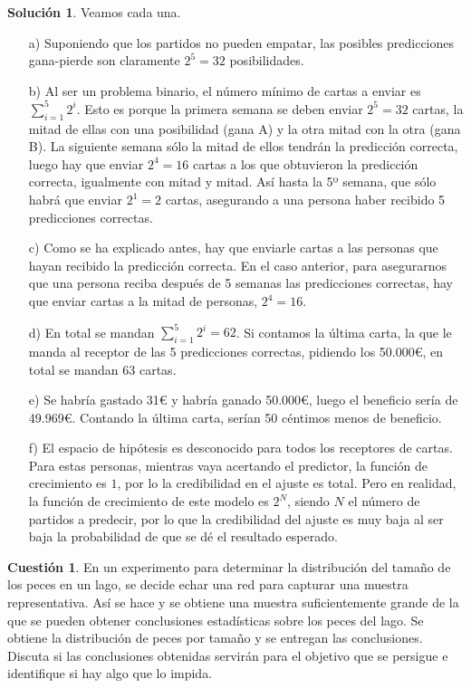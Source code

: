 \documentclass[a4paper, 11pt]{article}
\theoremstyle{definition}
\newtheorem{cuestion}{Cuestión}
\newtheorem*{solucion}{Solución}
\begin{document}
  \begin{solucion}
    Veamos cada una.

    \begin{enumerate}
      \item[a)] Suponiendo que los partidos no pueden empatar, las posibles predicciones gana-pierde son claramente $2^5=32$ posibilidades.
      \item[b)] Al ser un problema binario, el número mínimo de cartas a enviar es $\sum_{i=1}^5 2^i$. Esto es porque la primera semana se deben enviar $2^5=32$ cartas, la mitad de ellas con una posibilidad (gana A) y la otra mitad con la otra (gana B). La siguiente semana sólo la mitad de ellos tendrán la predicción correcta, luego hay que enviar $2^4=16$ cartas a los que obtuvieron la predicción correcta, igualmente con mitad y mitad. Así hasta la 5º semana, que sólo habrá que enviar $2^1=2$ cartas, asegurando a una persona haber recibido 5 predicciones correctas.
      \item[c)] Como se ha explicado antes, hay que enviarle cartas a las personas que hayan recibido la predicción correcta. En el caso anterior, para asegurarnos que una persona reciba después de 5 semanas las predicciones correctas, hay que enviar cartas a la mitad de personas, $2^4=16$.
      \item[d)] En total se mandan $\sum_{i=1}^5 2^i = 62$. Si contamos la última carta, la que le manda al receptor de las 5 predicciones correctas, pidiendo los 50.000\euro{}, en total se mandan $63$ cartas.
      \item[e)] Se habría gastado 31\euro{} y habría ganado 50.000\euro{}, luego el beneficio sería de 49.969\euro{}. Contando la última carta, serían 50 céntimos menos de beneficio.
      \item[f)] El espacio de hipótesis es desconocido para todos los receptores de cartas. Para estas personas, mientras vaya acertando el predictor, la función de crecimiento es $1$, por lo la credibilidad en el ajuste es total. Pero en realidad, la función de crecimiento de este modelo es $2^N$, siendo $N$ el número de partidos a predecir, por lo que la credibilidad del ajuste es muy baja al ser baja la probabilidad de que se dé el resultado esperado.
    \end{enumerate}
  \end{solucion}

  \begin{cuestion}
    En un experimento para determinar la distribución del tamaño de los peces en un lago, se decide echar una red para capturar una muestra representativa. Así se hace y se obtiene una muestra suficientemente grande de la que se pueden obtener conclusiones estadísticas sobre los peces del lago. Se obtiene la distribución de peces por tamaño y se entregan las conclusiones. Discuta si las conclusiones obtenidas servirán para el objetivo que se persigue e identifique si hay algo que lo impida.
  \end{cuestion}
\end{document}
